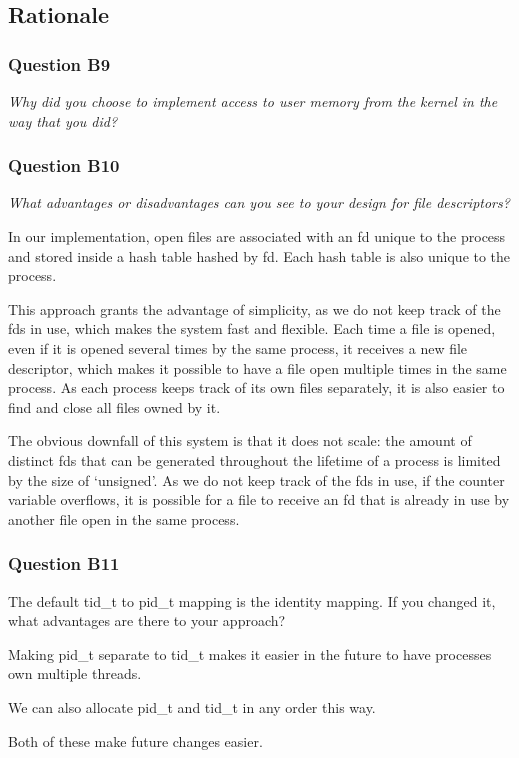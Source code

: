 \subsection{Rationale}

\subsubsection*{Question B9} %
\textit{Why did you choose to implement access to user memory from the kernel in the way that you did?}

\subsubsection*{Question B10} %
\textit{What advantages or disadvantages can you see to your design for file descriptors?}

In our implementation, open files are associated with an fd unique to the process and stored inside a hash table hashed by fd. Each hash table is also unique to the process.

This approach grants the advantage of simplicity, as we do not keep track of the fds in use, which makes the system fast and flexible.
Each time a file is opened, even if it is opened several times by the same process, it receives a new file descriptor, which makes it possible to have a file open multiple times in the same process.
As each process keeps track of its own files separately, it is also easier to find and close all files owned by it.

The obvious downfall of this system is that it does not scale: the amount of distinct fds that can be generated throughout the lifetime of a process is limited by the size of `unsigned'. As we do not keep track of the fds in use, if the counter variable overflows, it is possible for a file to receive an fd that is already in use by another file open in the same process.


\subsubsection*{Question B11} %
The default tid\_t to pid\_t mapping is the identity mapping. If you changed it, what advantages are there to your approach?

Making pid\_t separate to tid\_t makes it easier in the future to have processes own multiple threads.

We can also allocate pid\_t and tid\_t in any order this way.

Both of these make future changes easier.
